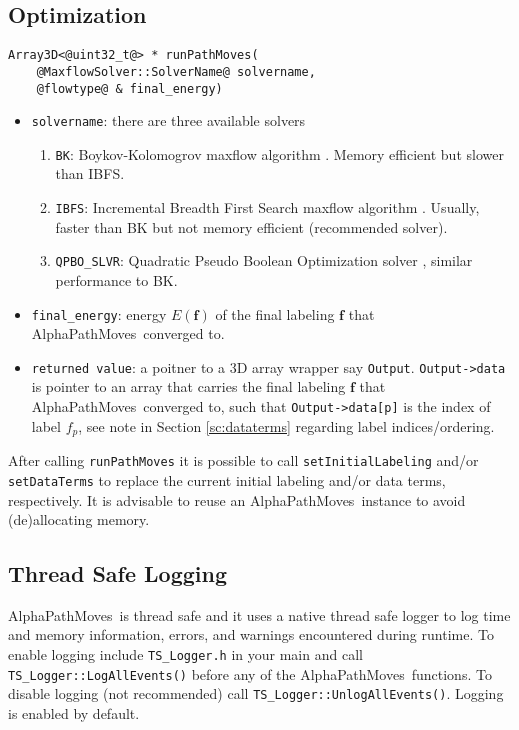 \documentclass[12pt,letterpaper]{article}
\def\APM{{\ttfamily AlphaPathMoves}~}
\def\labelvars{\mathbf{f}}
\def\labelvar{f}
\begin{document}
\subsection{Optimization}
\begin{lstlisting}
Array3D<@uint32_t@> * runPathMoves(
    @MaxflowSolver::SolverName@ solvername,
    @flowtype@ & final_energy)
\end{lstlisting}
\begin{itemize}
\item \lstinline{solvername}: there are three available solvers
\begin{enumerate}
\item \lstinline{BK}: Boykov-Kolomogrov maxflow algorithm \cite{boykov2004experimental}. Memory efficient but slower than IBFS.
\item \lstinline{IBFS}: Incremental Breadth First Search maxflow algorithm \cite{Goldberg2015}. Usually, faster than BK but not memory efficient (recommended solver).
\item \lstinline{QPBO_SLVR}: Quadratic Pseudo Boolean Optimization solver \cite{rother2007optimizing}, similar performance to BK.
\end{enumerate}
\item \lstinline{final_energy}:  energy $E(\labelvars)$ of the final labeling $\labelvars$ that \APM converged to.
\item \lstinline{returned value}: a poitner to a 3D array wrapper say \lstinline{Output}.  \lstinline{Output->data} is pointer to an array that carries the final labeling $\labelvars$ that \APM converged to, such that \lstinline{Output->data[p]} is the index of label $\labelvar_p$, see note in Section \ref{sc:dataterms} regarding label indices/ordering.
\end{itemize}
\begin{tcolorbox}
After calling \lstinline{runPathMoves} it is possible to call \lstinline{setInitialLabeling} and/or \lstinline{setDataTerms} to replace the current initial labeling and/or data terms, respectively. It is advisable to reuse an \APM instance to avoid (de)allocating memory.
\end{tcolorbox}

\subsection{Thread Safe Logging}
\APM is thread safe and it uses a native thread safe logger to log time and memory information, errors, and warnings encountered during runtime.
To enable logging include \lstinline{TS_Logger.h} in your main and call \lstinline{TS_Logger::LogAllEvents()} before any of the \APM functions. To disable logging (not recommended) call \lstinline{TS_Logger::UnlogAllEvents()}. Logging is enabled by default.
\end{document}
